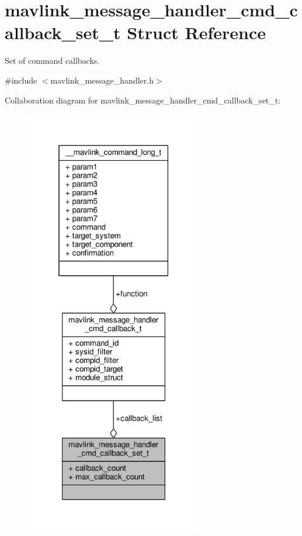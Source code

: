 \hypertarget{structmavlink__message__handler__cmd__callback__set__t}{\section{mavlink\+\_\+message\+\_\+handler\+\_\+cmd\+\_\+callback\+\_\+set\+\_\+t Struct Reference}
\label{structmavlink__message__handler__cmd__callback__set__t}
}


Set of command callbacks.  




{\ttfamily \#include $<$mavlink\+\_\+message\+\_\+handler.\+h$>$}



Collaboration diagram for mavlink\+\_\+message\+\_\+handler\+\_\+cmd\+\_\+callback\+\_\+set\+\_\+t\+:
\nopagebreak
\begin{figure}[H]
\begin{center}
\leavevmode
\includegraphics[width=220pt]{structmavlink__message__handler__cmd__callback__set__t__coll__graph}
\end{center}
\end{figure}
